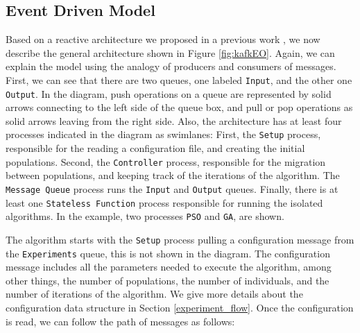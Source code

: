 \documentclass[review]{elsarticle}
\begin{document}
\subsection{Event Driven Model} 
\label{edm}
Based on a reactive architecture we proposed in a previous work
\cite{guervos2018introducing}, we now describe the general architecture shown in
Figure \ref{fig:kafkEO}. Again, we can explain the model using the analogy
of producers and consumers of messages. First, we can see that
there are two queues, one labeled \texttt{Input}, and the other one \texttt{Output}. In the diagram, 
push operations on a queue are represented by solid arrows connecting to the left side
of the queue box, and pull or pop operations as solid arrows leaving from the right side.
Also, the architecture has at least four processes indicated in the diagram as
swimlanes: First, the \texttt{Setup} process, responsible for the reading a configuration
file, and creating the initial populations. Second, the \texttt{Controller} process,
responsible for the migration between populations, and keeping track of the
iterations of the algorithm. The \texttt{Message Queue} process runs the \texttt{Input} and \texttt{Output}
queues. Finally, there is at least one \texttt{Stateless Function} process responsible
for running the isolated algorithms. In the example, two processes \texttt{PSO} and \texttt{GA},
are shown. 

The algorithm starts with the \texttt{Setup} process pulling a configuration message from
the \texttt{Experiments} queue, this is not shown in the diagram. The configuration message 
includes all the parameters needed to execute the algorithm, among other things,
the number of populations, the number of individuals, and the number of iterations
of the algorithm. We give more details about the configuration data structure
in Section \ref{experiment_flow}. %
Once the configuration is read, we can follow the path of 
messages as follows:
\end{document}

